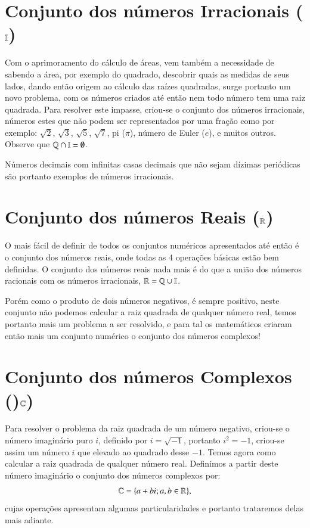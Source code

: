 \section{Conjunto dos números Irracionais (\texorpdfstring{$\mathbb{I}$}{I})}

Com o aprimoramento do cálculo de áreas, vem também a necessidade de sabendo a área, por exemplo do quadrado, descobrir quais as medidas de seus lados, dando então origem ao cálculo das raízes quadradas, surge portanto um novo problema, com os números criados até então nem todo número tem uma raiz quadrada. Para resolver este impasse, criou-se o conjunto dos números irracionais, números estes que não podem ser representados por uma fração como por exemplo: $\sqrt{2}$, $\sqrt{3}$, $\sqrt{5}$, $\sqrt{7}$, pi ($\pi$), número de Euler ($e$), e muitos outros. Observe que $\mathbb{Q} \cap \mathbb{I} = \emptyset$.

Números decimais com infinitas casas decimais que não sejam dízimas periódicas são portanto exemplos de números irracionais.

\section{Conjunto dos números Reais (\texorpdfstring{$\mathbb{R}$}{R})}

O mais fácil de definir de todos os conjuntos numéricos apresentados até então é o conjunto dos números reais, onde todas as 4 operações básicas estão bem definidas. O conjunto dos números reais nada mais é do que a união dos números racionais com os números irracionais, $\mathbb{R}= \mathbb{Q} \cup \mathbb{I}$.

Porém como o produto de dois números negativos, é sempre positivo, neste conjunto não podemos calcular a raiz quadrada de qualquer número real, temos portanto mais um problema a ser resolvido, e para tal os matemáticos criaram então mais um conjunto numérico o conjunto dos números complexos!


\section{Conjunto dos números Complexos ()\texorpdfstring{$\mathbb{C}$}{C})}

Para resolver o problema da raiz quadrada de um número negativo, criou-se o número imaginário puro $i$, definido por $i= \sqrt{-1}$, portanto $i^2= -1$, criou-se assim um número $i$ que elevado ao quadrado desse $-1$. Temos agora como calcular a raiz quadrada de qualquer número real. Definimos a partir deste número imaginário o conjunto dos números complexos por:
\[\mathbb{C}= \{a + bi; a, b \in \mathbb{R} \} ,\]
cujas operações apresentam algumas particularidades e portanto trataremos delas mais adiante.

